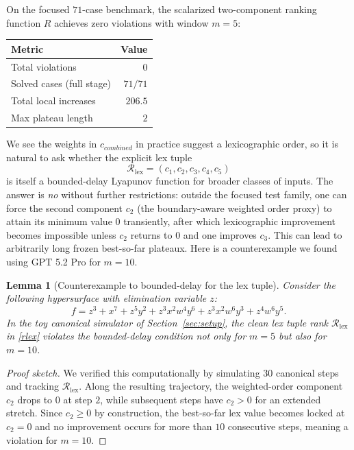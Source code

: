 \documentclass[11pt]{amsart}
\newtheorem{lemma}{Lemma}
\begin{document}
On the focused $71$-case benchmark, the scalarized two-component ranking function $R$ achieves zero violations with window $m=5$:

\begin{center}
\begin{tabular}{@{}lr@{}}
\toprule
Metric & Value \\
\midrule
Total violations  & $0$ \\
Solved cases (full stage) & $71/71$ \\
Total local increases & $206.5$ \\
Max plateau length & $2$ \\
\bottomrule
\end{tabular}
\end{center}

We see the weights in $c_{combined} $ in practice suggest a lexicographic order, so it is natural to ask whether the explicit lex tuple 
\begin{equation}\label{rlex}
    \mathcal R_{\mathrm{lex}}=(c_1,c_2,c_3,c_4,c_5)
\end{equation}
is itself a bounded-delay Lyapunov function for broader classes of inputs.
The answer is \emph{no} without further restrictions: outside the focused test family, one can force the second component $c_2$ (the boundary-aware weighted order proxy) to attain its minimum value $0$ transiently, after which lexicographic improvement becomes impossible unless $c_2$ returns to $0$ and one improves $c_3$.
This can lead to arbitrarily long frozen best-so-far plateaux. Here is a counterexample we found using GPT 5.2 Pro for $m=10$.

\begin{lemma}[Counterexample to bounded-delay for the lex tuple]
\label{prop:clean-lex-counterexample}
Consider the following hypersurface with elimination variable $z$:
\[
f = z^3 + x^7 + z^5 y^2 + z^3 x^2 w^4 y^6 + z^3 x^2 w^6 y^3 + z^4 w^6 y^5.
\]
In the toy canonical simulator of Section~\ref{sec:setup}, the clean lex tuple rank $\mathcal R_{\mathrm{lex}}$ in \eqref{rlex} violates the bounded-delay condition not only for $m=5$ but also for $m=10$.
\end{lemma}

\begin{proof}[Proof sketch]
We verified this computationally by simulating $30$ canonical steps and tracking $\mathcal R_{\mathrm{lex}}$.
Along the resulting trajectory, the weighted-order component $c_2$ drops to $0$ at step $2$, while subsequent steps have $c_2>0$ for an extended stretch.
Since $c_2\ge 0$ by construction, the best-so-far lex value becomes locked at $c_2=0$ and no improvement occurs for more than $10$ consecutive steps, meaning  a violation for $m=10$.
\end{proof}
\end{document}
